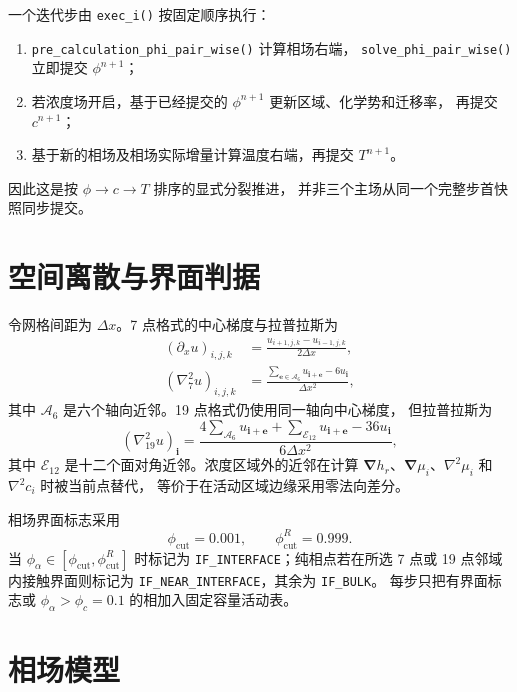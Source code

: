 \documentclass[UTF8,a4paper,11pt]{ctexart}
\newcommand{\grad}{\bm{\nabla}}
\newcommand{\vct}[1]{\bm{#1}}
\newcommand{\code}[1]{\texttt{#1}}
\begin{document}
一个迭代步由 \code{exec\_i()} 按固定顺序执行：
\begin{enumerate}
  \item \code{pre\_calculation\_phi\_pair\_wise()} 计算相场右端，
        \code{solve\_phi\_pair\_wise()} 立即提交 $\phi^{n+1}$；
  \item 若浓度场开启，基于已经提交的 $\phi^{n+1}$ 更新区域、化学势和迁移率，
        再提交 $c^{n+1}$；
  \item 基于新的相场及相场实际增量计算温度右端，再提交 $T^{n+1}$。
\end{enumerate}
因此这是按 $\phi\rightarrow c\rightarrow T$ 排序的显式分裂推进，
并非三个主场从同一个完整步首快照同步提交。

\section{空间离散与界面判据}

令网格间距为 $\Delta x$。7 点格式的中心梯度与拉普拉斯为
\begin{align}
 (\partial_x u)_{i,j,k}
 &=\frac{u_{i+1,j,k}-u_{i-1,j,k}}{2\Delta x},\\
 (\nabla^2_7u)_{i,j,k}
 &=\frac{\sum_{\vct e\in\mathcal A_6}u_{\vct i+\vct e}-6u_{\vct i}}
         {\Delta x^2},
\end{align}
其中 $\mathcal A_6$ 是六个轴向近邻。19 点格式仍使用同一轴向中心梯度，
但拉普拉斯为
\begin{equation}
 (\nabla^2_{19}u)_{\vct i}
 =\frac{4\sum_{\mathcal A_6}u_{\vct i+\vct e}
 +\sum_{\mathcal E_{12}}u_{\vct i+\vct e}-36u_{\vct i}}
 {6\Delta x^2},
 \label{eq:lap19}
\end{equation}
其中 $\mathcal E_{12}$ 是十二个面对角近邻。浓度区域外的近邻在计算
$\grad h_r$、$\grad\mu_i$、$\nabla^2\mu_i$ 和 $\nabla^2c_i$ 时被当前点替代，
等价于在活动区域边缘采用零法向差分。

相场界面标志采用
\begin{equation}
 \phi_{\mathrm{cut}}=0.001,\qquad
 \phi_{\mathrm{cut}}^R=0.999.
\end{equation}
当 $\phi_\alpha\in[\phi_{\mathrm{cut}},\phi_{\mathrm{cut}}^R]$ 时标记为
\code{IF\_INTERFACE}；纯相点若在所选 7 点或 19 点邻域内接触界面则标记为
\code{IF\_NEAR\_INTERFACE}，其余为 \code{IF\_BULK}。
每步只把有界面标志或 $\phi_\alpha>\phi_c=0.1$ 的相加入固定容量活动表。

\section{相场模型}
\end{document}
